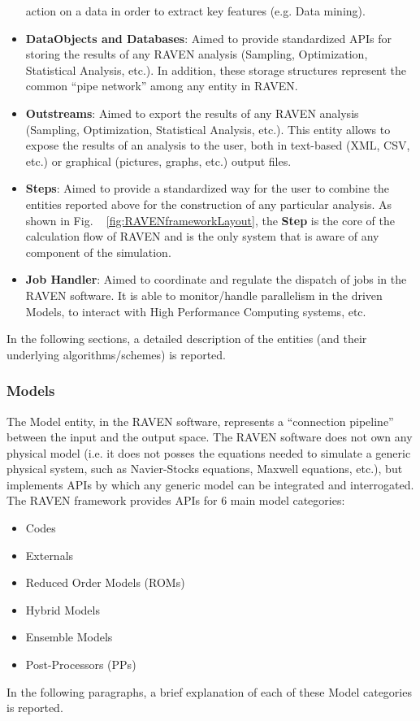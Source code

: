 \begin{itemize}
action on a data in order to extract key features (e.g. Data mining).
\item 	\textbf{DataObjects and Databases}: Aimed to provide standardized APIs for storing the results of any RAVEN analysis 
(Sampling, Optimization, Statistical Analysis, etc.). In addition, these storage structures represent the common ``pipe 
network'' among any entity in RAVEN.
\item 	\textbf{Outstreams}: Aimed to export the results of any RAVEN analysis (Sampling, 
Optimization, Statistical Analysis, etc.). This entity allows to expose the results of an analysis to the user, both in text-based (XML, CSV, etc.) or graphical (pictures, graphs, etc.) output files.
\item 	\textbf{Steps}: Aimed to provide a standardized way for the user to combine the entities reported above for the construction of any particular analysis. As shown in Fig. ~ \ref{fig:RAVENframeworkLayout}, the \textbf{Step} is the core 
of the calculation flow of RAVEN and is the only system that is aware of any component of the simulation.
\item	\textbf{Job Handler}: Aimed to coordinate and regulate the dispatch of jobs in the RAVEN software. It is able to monitor/handle parallelism in the driven Models, to interact with High Performance Computing systems, etc.
\end{itemize}
In the following sections, a detailed description of the entities (and their underlying algorithms/schemes) is reported.

\subsubsection{Models}
The Model entity, in the RAVEN software, represents a ``connection pipeline'' between the input and the output space. The 
RAVEN software does not own any physical model (i.e. it does not posses the equations needed to simulate a generic 
physical system, such as Navier-Stocks equations, Maxwell equations, etc.), but implements APIs by which any generic 
model can be integrated and interrogated. The RAVEN framework provides APIs for 
6 main model categories: 
\begin{itemize}
  \item Codes
  \item Externals
  \item Reduced Order Models (ROMs)
  \item Hybrid Models
  \item Ensemble Models
  \item Post-Processors (PPs)
\end{itemize}
In the 
following paragraphs, a brief explanation of each of these Model categories is reported.
